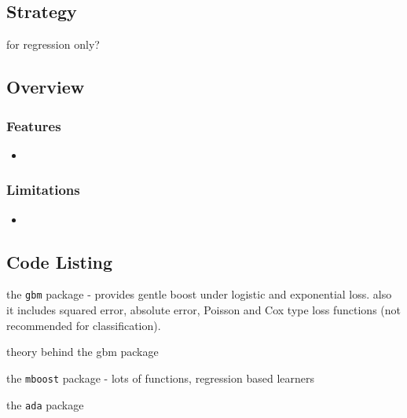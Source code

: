 \subsection{Strategy}


for regression only?



\subsection{Overview}

\subsubsection{Features}

\begin{itemize}
	\item 
\end{itemize}

\subsubsection{Limitations}

\begin{itemize}
	\item 
\end{itemize}


\subsection{Code Listing}

the \texttt{gbm} package - provides gentle boost under logistic and exponential loss. also it includes squared error, absolute error, Poisson and Cox type loss functions (not recommended for classification).

theory behind the gbm package \cite{Ridgeway2007} \cite{Ridgeway2007a}

the \texttt{mboost} package - lots of functions, regression based learners

the \texttt{ada} package \cite{Culp2007}



